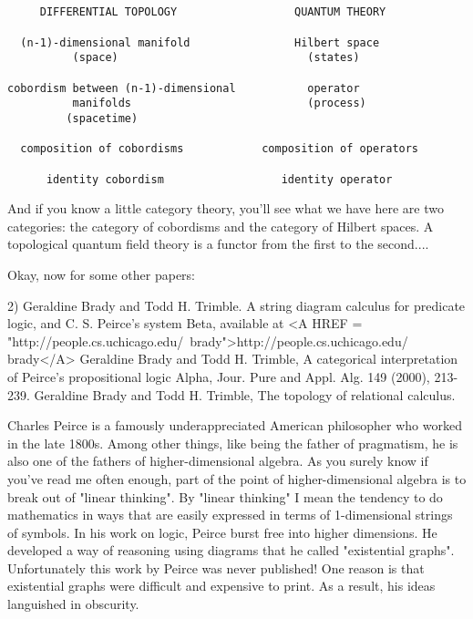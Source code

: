 \begin{verbatim}


     DIFFERENTIAL TOPOLOGY                  QUANTUM THEORY            

  (n-1)-dimensional manifold                Hilbert space             
          (space)                             (states)                  

cobordism between (n-1)-dimensional           operator    
          manifolds                           (process)                 
         (spacetime)                         

  composition of cobordisms            composition of operators  

      identity cobordism                  identity operator         

\end{verbatim}
    
And if you know a little category theory, you'll see what we have
here are two categories: the category of cobordisms and the category
of Hilbert spaces.  A topological quantum field theory is a functor
from the first to the second....

Okay, now for some other papers:

2) Geraldine Brady and Todd H. Trimble. A string diagram calculus for
predicate logic, and C. S. Peirce's system Beta, available at
<A HREF = "http://people.cs.uchicago.edu/~brady">http://people.cs.uchicago.edu/~
brady</A>
Geraldine Brady and Todd H. Trimble, A categorical interpretation
of Peirce's propositional logic Alpha, Jour. Pure and
Appl. Alg. 149 (2000), 213-239.
Geraldine Brady and Todd H. Trimble, The topology of relational
calculus.



Charles Peirce is a famously underappreciated American philosopher who
worked in the late 1800s.  Among other things, like being the father of
pragmatism, he is also one of the fathers of higher-dimensional algebra.
As you surely know if you've read me often enough, part of the point of
higher-dimensional algebra is to break out of "linear thinking".  By
"linear thinking" I mean the tendency to do mathematics in ways that are
easily expressed in terms of 1-dimensional strings of symbols.  In his
work on logic, Peirce burst free into higher dimensions.  He developed a
way of reasoning using diagrams that he called "existential graphs".  
Unfortunately this work by Peirce was never published!  One reason is 
that existential graphs were difficult and expensive to print.  As a
result, his ideas languished in obscurity.

